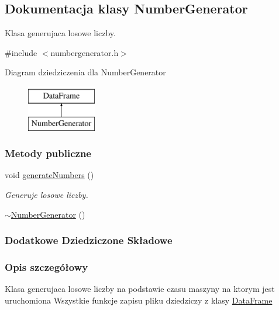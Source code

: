 \hypertarget{class_number_generator}{\subsection{Dokumentacja klasy Number\-Generator}
\label{class_number_generator}
}


Klasa generujaca losowe liczby.  




{\ttfamily \#include $<$numbergenerator.\-h$>$}

Diagram dziedziczenia dla Number\-Generator\begin{figure}[H]
\begin{center}
\leavevmode
\includegraphics[height=2.000000cm]{class_number_generator}
\end{center}
\end{figure}
\subsubsection*{Metody publiczne}
\begin{DoxyCompactItemize}
\item 
void \hyperlink{class_number_generator_afe038fce2f1a2c90847fd483beea0494}{generate\-Numbers} ()
\begin{DoxyCompactList}\small\item\em Generuje losowe liczby. \end{DoxyCompactList}\item 
\hyperlink{class_number_generator_a828757cc2c9712e0b111584d1f1d5164}{$\sim$\-Number\-Generator} ()
\end{DoxyCompactItemize}
\subsubsection*{Dodatkowe Dziedziczone Składowe}


\subsubsection{Opis szczegółowy}
Klasa generujaca losowe liczby na podstawie czasu maszyny na ktorym jest uruchomiona Wszystkie funkcje zapisu pliku dziedziczy z klasy \hyperlink{class_data_frame}{Data\-Frame} 

